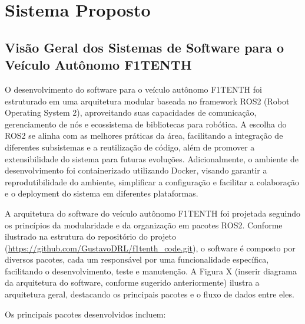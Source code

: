 \chapter{Sistema Proposto}\label{cap:proposta}

\section{Visão Geral dos Sistemas de Software para o Veículo Autônomo F1TENTH}

O desenvolvimento do software para o veículo autônomo F1TENTH foi estruturado
em uma arquitetura modular baseada no framework ROS2 (Robot Operating System
2), aproveitando suas capacidades de comunicação, gerenciamento de nós e
ecossistema de bibliotecas para robótica. A escolha do ROS2 se alinha com as
melhores práticas da área, facilitando a integração de diferentes subsistemas e
a reutilização de código, além de promover a extensibilidade do sistema para
futuras evoluções. Adicionalmente, o ambiente de desenvolvimento foi
containerizado utilizando Docker, visando garantir a reprodutibilidade do
ambiente, simplificar a configuração e facilitar a colaboração e o deployment
do sistema em diferentes plataformas.

A arquitetura do software do veículo autônomo F1TENTH foi projetada seguindo os
princípios da modularidade e da organização em pacotes ROS2. Conforme ilustrado
na estrutura do repositório do projeto
(\url{https://github.com/GustavoDRL/f1tenth_code.git}), o software é composto
por diversos pacotes, cada um responsável por uma funcionalidade específica,
facilitando o desenvolvimento, teste e manutenção. A Figura X (inserir diagrama
da arquitetura do software, conforme sugerido anteriormente) ilustra a
arquitetura geral, destacando os principais pacotes e o fluxo de dados entre
eles.

Os principais pacotes desenvolvidos incluem:

